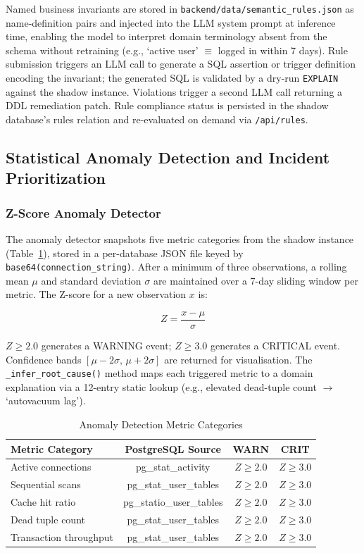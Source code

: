 \documentclass[conference]{IEEEtran}
\begin{document}
Named business invariants are stored in
\texttt{backend/data/semantic\_rules.json} as name-definition pairs and
injected into the LLM system prompt at inference time, enabling the model
to interpret domain terminology absent from the schema without retraining
(e.g., `active user' $\equiv$ logged in within 7 days). Rule submission
triggers an LLM call to generate a SQL assertion or trigger definition
encoding the invariant; the generated SQL is validated by a dry-run
\texttt{EXPLAIN} against the shadow instance. Violations trigger a second
LLM call returning a DDL remediation patch. Rule compliance status is
persisted in the shadow database's rules relation and re-evaluated on
demand via \texttt{/api/rules}.

\subsection{Statistical Anomaly Detection and Incident Prioritization}

\subsubsection{Z-Score Anomaly Detector}

The anomaly detector snapshots five metric categories from the shadow
instance (Table~\ref{tab:anomaly}), stored in a per-database JSON file
keyed by \texttt{base64(connection\_string)}. After a minimum of three
observations, a rolling mean $\mu$ and standard deviation $\sigma$ are
maintained over a 7-day sliding window per metric. The Z-score for a new
observation $x$ is:

\begin{equation}
    Z = \frac{x - \mu}{\sigma}
\end{equation}

$Z \geq 2.0$ generates a WARNING event; $Z \geq 3.0$ generates a CRITICAL
event. Confidence bands $[\mu - 2\sigma,\, \mu + 2\sigma]$ are returned
for visualisation. The \texttt{\_infer\_root\_cause()} method maps each
triggered metric to a domain explanation via a 12-entry static lookup
(e.g., elevated dead-tuple count $\to$ `autovacuum lag').

\begin{table}[htbp]
\caption{Anomaly Detection Metric Categories}
\label{tab:anomaly}
\begin{tabular}{lccc}
\toprule
\textbf{Metric Category} & \textbf{PostgreSQL Source} & \textbf{WARN} & \textbf{CRIT} \\
\midrule
Active connections & pg\_stat\_activity & $Z \geq 2.0$ & $Z \geq 3.0$ \\
Sequential scans & pg\_stat\_user\_tables & $Z \geq 2.0$ & $Z \geq 3.0$ \\
Cache hit ratio & pg\_statio\_user\_tables & $Z \geq 2.0$ & $Z \geq 3.0$ \\
Dead tuple count & pg\_stat\_user\_tables & $Z \geq 2.0$ & $Z \geq 3.0$ \\
Transaction throughput & pg\_stat\_user\_tables & $Z \geq 2.0$ & $Z \geq 3.0$ \\
\bottomrule
\end{tabular}
\end{table}
\end{document}
